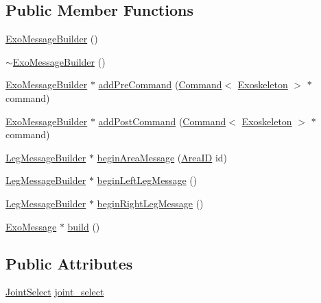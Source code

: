 \subsection*{Public Member Functions}
\begin{DoxyCompactItemize}
\item 
\hyperlink{classExoMessageBuilder_a945a7e743d70ad2265be0131d378705b}{Exo\+Message\+Builder} ()
\item 
\hyperlink{classExoMessageBuilder_a42b77a7a914cec1accf35698c653005b}{$\sim$\+Exo\+Message\+Builder} ()
\item 
\hyperlink{classExoMessageBuilder}{Exo\+Message\+Builder} $\ast$ \hyperlink{classExoMessageBuilder_a8628cf50333fa20f8309ff6dbf5bb3c1}{add\+Pre\+Command} (\hyperlink{classCommand}{Command}$<$ \hyperlink{classExoskeleton}{Exoskeleton} $>$ $\ast$command)
\item 
\hyperlink{classExoMessageBuilder}{Exo\+Message\+Builder} $\ast$ \hyperlink{classExoMessageBuilder_a0a964b8517f3c679113bb874a4fdfff9}{add\+Post\+Command} (\hyperlink{classCommand}{Command}$<$ \hyperlink{classExoskeleton}{Exoskeleton} $>$ $\ast$command)
\item 
\hyperlink{classLegMessageBuilder}{Leg\+Message\+Builder} $\ast$ \hyperlink{classExoMessageBuilder_aabebaab998f701c2c296ef471757e50a}{begin\+Area\+Message} (\hyperlink{JointSelect_8hpp_a0b0b6279ef5d4a446f8f07404dc868d3}{Area\+ID} id)
\item 
\hyperlink{classLegMessageBuilder}{Leg\+Message\+Builder} $\ast$ \hyperlink{classExoMessageBuilder_ac6cf79896b47d07f6f7f814d141872db}{begin\+Left\+Leg\+Message} ()
\item 
\hyperlink{classLegMessageBuilder}{Leg\+Message\+Builder} $\ast$ \hyperlink{classExoMessageBuilder_ada1f9ccc3973815c198f80fe249ce5f5}{begin\+Right\+Leg\+Message} ()
\item 
\hyperlink{classExoMessage}{Exo\+Message} $\ast$ \hyperlink{classExoMessageBuilder_a500aa272dbefe9161a59cb66b03b84df}{build} ()
\end{DoxyCompactItemize}
\subsection*{Public Attributes}
\begin{DoxyCompactItemize}
\item 
\hyperlink{classJointSelect}{Joint\+Select} \hyperlink{classExoMessageBuilder_aed2ae0c14e8bbb3019378558337d1b01}{joint\+\_\+select}
\end{DoxyCompactItemize}
